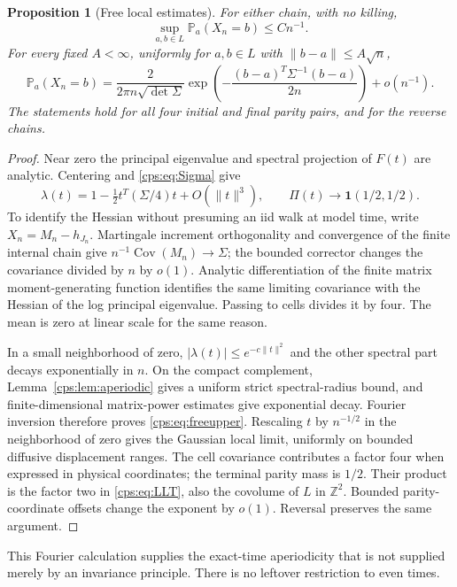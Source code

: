 \documentclass[11pt,letterpaper]{article}
\numberwithin{equation}{section}
\newtheorem{proposition}[theorem]{Proposition}
\theoremstyle{remark}\newtheorem{remark}[theorem]{Remark}
\newcommand{\PP}{\mathbb P}
\newcommand{\ZZ}{\mathbb Z}
\newcommand{\Cov}{\operatorname{Cov}}
\newcommand{\one}{\mathbf 1}
\newcommand{\norm}[1]{\lVert#1\rVert}
\begin{document}
\begin{proposition}[Free local estimates]\label{cps:prop:local}
For either chain, with no killing,
\begin{equation}\label{cps:eq:freeupper}
 \sup_{a,b\in L}\PP_a(X_n=b)\le Cn^{-1}.
\end{equation}
For every fixed $A<\infty$, uniformly for $a,b\in L$ with $\norm{b-a}\le A\sqrt n$,
\begin{equation}\label{cps:eq:LLT}
 \PP_a(X_n=b)=\frac{2}{2\pi n\sqrt{\det\Sigma}}
 \exp\!\left(-\frac{(b-a)^T\Sigma^{-1}(b-a)}{2n}\right)+o(n^{-1}).
\end{equation}
The statements hold for all four initial and final parity pairs, and for the reverse chains.
\end{proposition}
\begin{proof}
Near zero the principal eigenvalue and spectral projection of $F(t)$ are analytic. Centering and \eqref{cps:eq:Sigma} give
\begin{equation}\label{cps:eq:lambda}
 \lambda(t)=1-\tfrac12t^T(\Sigma/4)t+O(\norm t^3),
 \qquad\Pi(t)\longrightarrow\one(1/2,1/2).
\end{equation}
To identify the Hessian without presuming an iid walk at model time, write $X_n=M_n-h_{J_n}$. Martingale increment orthogonality and convergence of the finite internal chain give $n^{-1}\Cov(M_n)\to\Sigma$; the bounded corrector changes the covariance divided by $n$ by $o(1)$. Analytic differentiation of the finite matrix moment-generating function identifies the same limiting covariance with the Hessian of the log principal eigenvalue. Passing to cells divides it by four. The mean is zero at linear scale for the same reason.

In a small neighborhood of zero, $|\lambda(t)|\le e^{-c\norm t^2}$ and the other spectral part decays exponentially in $n$. On the compact complement, Lemma~\ref{cps:lem:aperiodic} gives a uniform strict spectral-radius bound, and finite-dimensional matrix-power estimates give exponential decay. Fourier inversion therefore proves \eqref{cps:eq:freeupper}. Rescaling $t$ by $n^{-1/2}$ in the neighborhood of zero gives the Gaussian local limit, uniformly on bounded diffusive displacement ranges. The cell covariance contributes a factor four when expressed in physical coordinates; the terminal parity mass is $1/2$. Their product is the factor two in \eqref{cps:eq:LLT}, also the covolume of $L$ in $\ZZ^2$. Bounded parity-coordinate offsets change the exponent by $o(1)$. Reversal preserves the same argument.
\end{proof}
This Fourier calculation supplies the exact-time aperiodicity that is not supplied merely by an invariance principle. There is no leftover restriction to even times.
\end{document}

